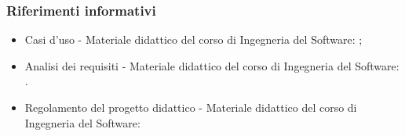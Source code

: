 \subsubsection{Riferimenti informativi}
\begin{itemize}
    \item Casi d'uso - Materiale didattico del corso di Ingegneria del Software: \newline{};
    \item Analisi dei requisiti - Materiale didattico del corso di Ingegneria del Software: \newline {}.
    \item Regolamento del progetto didattico - Materiale didattico del corso di Ingegneria del Software:\newline {}
\end{itemize}


